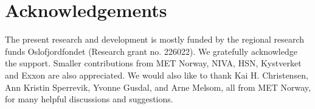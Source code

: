 \documentclass[12pt,a4paper,english]{article}
\begin{document}
\clearpage
\pagestyle{plain}












\clearpage
\section*{\hspace{17mm}Acknowledgements}
The present research and development is mostly funded by the regional research funds Oslofjordfondet (Research grant no. 226022). We gratefully acknowledge the support. Smaller contributions from MET Norway, NIVA, HSN, Kystverket and Exxon are also appreciated. We would also like to thank Kai H. Christensen, Ann Kristin Sperrevik, Yvonne Gusdal, and Arne Melsom, all from MET Norway, for many helpful discussions and suggestions.   




\clearpage
\pagebreak



\clearpage
\pagebreak
 
\end{document}
